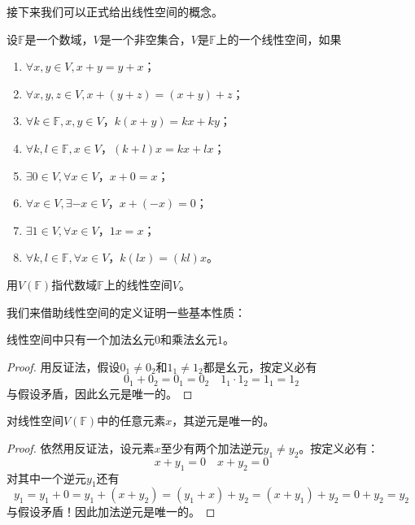     接下来我们可以正式给出线性空间的概念。
    \begin{definition}[线性空间]
        \label{def:1}
        设$\mathbb{F}$是一个数域，$V$是一个非空集合，$V$是$\mathbb{F}$上的一个线性空间，如果
        \begin{enumerate}
            \item $\forall x,y\in V,x+y=y+x$；
            \item $\forall x,y,z\in V,x+(y+z)=(x+y)+z$；
            \item $\forall k\in\mathbb{F},x,y\in V$，$k(x+y)=kx+ky$；
            \item $\forall k,l\in\mathbb{F},x\in V$，$(k+l)x=kx+lx$；
            \item $\exists0\in V,\forall x\in V$，$x+0=x$；
            \item $\forall x\in V,\exists -x\in V$，$x+(-x)=0$；
            \item $\exists 1\in V,\forall x\in V$，$1x=x$；
            \item $\forall k,l\in\mathbb{F},\forall x\in V$，$k(lx)=(kl)x$。
        \end{enumerate}
        用$V(\mathbb{F})$指代数域$\mathbb{F}$上的线性空间$V$。
    \end{definition}

    我们来借助线性空间的定义证明一些基本性质：
    \begin{theorem}[幺元的唯一性]
        \label{thm:2}
        线性空间中只有一个加法幺元$0$和乘法幺元$1$。
    \end{theorem}
    \begin{proof}
        用反证法，假设$0_1\ne0_2$和$1_1\ne1_2$都是幺元，按定义必有
        \[
        0_1+0_2=0_1=0_2 \quad 1_1\cdot1_2=1_1=1_2
        \]
        与假设矛盾，因此幺元是唯一的。
    \end{proof}

    \begin{theorem}[逆元的唯一性]
        \label{thm:3}
        对线性空间$V(\mathbb{F})$中的任意元素$x$，其逆元是唯一的。
    \end{theorem}
    \begin{proof}
        依然用反证法，设元素$x$至少有两个加法逆元$y_1\ne y_2$。按定义必有：
        \[
        x+y_1=0 \quad x+y_2=0
        \]
        对其中一个逆元$y_1$还有
        \[
        y_1=y_1+0=y_1+(x+y_2)=(y_1+x)+y_2=(x+y_1)+y_2=0+y_2=y_2
        \]
        与假设矛盾！因此加法逆元是唯一的。
    \end{proof}

